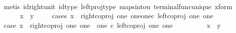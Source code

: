 \begin{isabellebody}
\ \ \ \ \ \ \isamarkupfalse%
\ {\isacharparenleft}{\kern0pt}metis\ id{\isacharunderscore}{\kern0pt}right{\isacharunderscore}{\kern0pt}unit{}\ id{\isacharunderscore}{\kern0pt}type\ left{\isacharunderscore}{\kern0pt}proj{\isacharunderscore}{\kern0pt}type\ maps{\isacharunderscore}{\kern0pt}into{\isacharunderscore}{\kern0pt}{}u{}\ terminal{\isacharunderscore}{\kern0pt}func{\isacharunderscore}{\kern0pt}unique\ x{\isacharunderscore}{\kern0pt}form{\isacharparenright}{\kern0pt}\isanewline
\ \ \ \ \isamarkupfalse%
\ {\isachardoublequoteopen}x\ {\isacharequal}{\kern0pt}\ y{\isachardoublequoteclose}\isanewline
\ \ \ \ \isamarkupfalse%
{\isacharparenleft}{\kern0pt}cases\ {\isachardoublequoteopen}x\ {\isacharequal}{\kern0pt}\ right{\isacharunderscore}{\kern0pt}coproj\ one\ {\isacharparenleft}{\kern0pt}one{\isasymCoprod}one{\isacharparenright}{\kern0pt}{\isasymcirc}\isactrlsub c\ left{\isacharunderscore}{\kern0pt}coproj\ one\ one{\isachardoublequoteclose}{\isacharparenright}{\kern0pt}\isanewline
\ \ \ \ \ \ \isamarkupfalse%
\ case{}{\isacharcolon}{\kern0pt}\ {\isachardoublequoteopen}x\ {\isacharequal}{\kern0pt}\ right{\isacharunderscore}{\kern0pt}coproj\ one\ {\isacharparenleft}{\kern0pt}one\ {\isasymCoprod}\ one{\isacharparenright}{\kern0pt}\ {\isasymcirc}\isactrlsub c\ left{\isacharunderscore}{\kern0pt}coproj\ one\ one{\isachardoublequoteclose}\isanewline
\ \ \ \ \ \ \isamarkupfalse%
\ \isamarkupfalse%
\ {\isachardoublequoteopen}x\ {\isacharequal}{\kern0pt}\ y{\isachardoublequoteclose}\isanewline
\ \ \ \ \ \ \ \ \isamarkupfalse%

\end{isabellebody}
